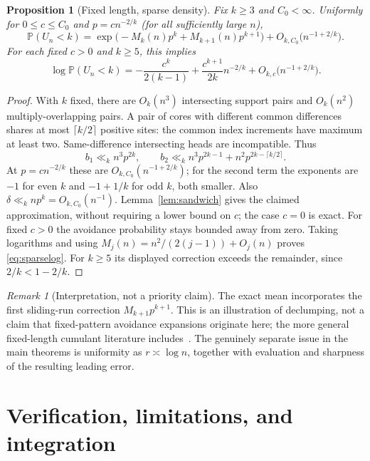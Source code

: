 \documentclass[11pt]{article}
\newtheorem{proposition}[theorem]{Proposition}
\theoremstyle{definition}\newtheorem{definition}[theorem]{Definition}
\theoremstyle{remark}\newtheorem{remark}[theorem]{Remark}
\newcommand{\PP}{\mathbb P}
\begin{document}
\begin{proposition}[Fixed length, sparse density]\label{prop:sparse}
Fix $k\ge3$ and $C_0<\infty$. Uniformly for
$0\le c\le C_0$ and $p=c n^{-2/k}$ (for all sufficiently large $n$),
\begin{equation}
 \PP(U_n<k)
 =\exp\bigl(-M_k(n)p^k+M_{k+1}(n)p^{k+1}\bigr)
       +O_{k,C_0}\bigl(n^{-1+2/k}\bigr).
 \label{eq:sparse}
\end{equation}
For each fixed $c>0$ and $k\ge5$, this implies
\begin{equation}
 \log\PP(U_n<k)
 =-\frac{c^k}{2(k-1)}
       +\frac{c^{k+1}}{2k}n^{-2/k}
       +O_{k,c}\bigl(n^{-1+2/k}\bigr).
 \label{eq:sparselog}
\end{equation}
\end{proposition}
\begin{proof}
With $k$ fixed, there are $O_k(n^3)$ intersecting support pairs and
$O_k(n^2)$ multiply-overlapping pairs. A pair of cores with different
common differences shares at most $\lceil k/2\rceil$ positive sites:
the common index increments have maximum at least two. Same-difference
intersecting heads are incompatible. Thus
\[
 b_1\ll_k n^3p^{2k},\qquad
 b_2\ll_k n^3p^{2k-1}+n^2p^{2k-\lceil k/2\rceil}.
\]
At $p=c n^{-2/k}$ these are
$O_{k,C_0}(n^{-1+2/k})$; for the second term the exponents are $-1$
for even $k$ and $-1+1/k$ for odd $k$, both smaller.
Also $\delta\ll_k np^k=O_{k,C_0}(n^{-1})$.
Lemma~\ref{lem:sandwich} gives the claimed approximation, without
requiring a lower bound on $c$; the case $c=0$ is exact.
For fixed $c>0$ the avoidance probability stays bounded away from zero.
Taking logarithms and using $M_j(n)=n^2/(2(j-1))+O_j(n)$ proves
\eqref{eq:sparselog}. For $k\ge5$ its displayed correction exceeds
the remainder, since $2/k<1-2/k$.
\end{proof}

\begin{remark}[Interpretation, not a priority claim]
The exact mean incorporates the first sliding-run correction
$M_{k+1}p^{k+1}$. This is an illustration of declumping, not a claim that
fixed-pattern avoidance expansions originate here; the more general
fixed-length cumulant literature includes~\cite{MNPS}. The genuinely
separate issue in the main theorems is uniformity as $r\asymp\log n$,
together with evaluation and sharpness of the resulting leading error.
\end{remark}

\section{Verification, limitations, and integration}\label{sec:verification}
\end{document}
